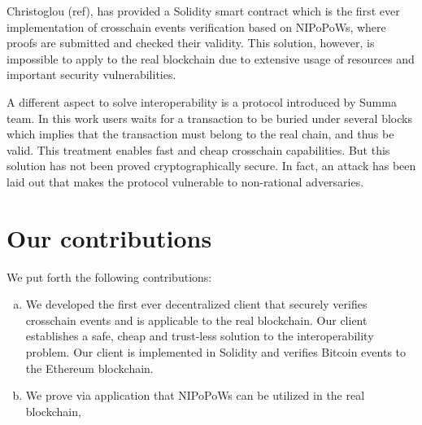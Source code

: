 Christoglou (ref), has provided a Solidity smart contract which is the first
ever implementation of crosschain events verification based on NIPoPoWs, where
proofs are submitted and checked their validity. This solution, however, is
impossible to apply to the real blockchain due to extensive usage of resources
and important security vulnerabilities.

A different aspect to solve interoperability is a protocol introduced by Summa
team. In this work users waits for a transaction to be buried under several
blocks which implies that the transaction must belong to the real chain, and
thus be valid. This treatment enables fast and cheap crosschain capabilities.
But this solution has not been proved cryptographically secure. In fact, an
attack has been laid out that makes the protocol vulnerable to non-rational
adversaries.

\section{Our contributions}


We put forth the following contributions:

\begin{enumerate}[(a)]

    \item We developed the first ever decentralized client that securely
        verifies crosschain events and is applicable to the real blockchain.
        Our client establishes a safe, cheap and trust-less solution to the
        interoperability problem. Our client is implemented in Solidity and
        verifies Bitcoin events to the Ethereum blockchain.

    \item We prove via application that NIPoPoWs can be utilized in the real
        blockchain, 

\end{enumerate}

